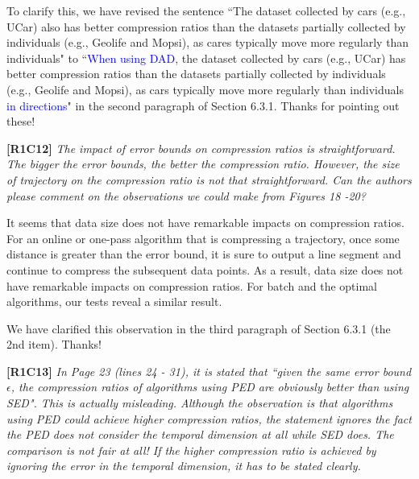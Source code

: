 \documentclass{letter}
\begin{document}
{To clarify this, we have revised the sentence ``The dataset collected by cars (e.g., UCar) also has better compression ratios than the datasets partially collected by individuals (e.g., Geolife and Mopsi), as cares typically move more regularly than individuals" to ``\textcolor{blue}{When using DAD,} the dataset collected by cars (e.g., UCar) has better compression ratios than the datasets partially collected by individuals (e.g., Geolife and Mopsi), as cars typically move more regularly than individuals \textcolor{blue}{in directions}" in the second paragraph of Section 6.3.1.
Thanks for pointing out these!


\textbf{[R1C12]} \emph{The impact of error bounds on compression ratios is straightforward. The bigger the error bounds, the better the compression ratio. However, the size of trajectory on the compression ratio is not that straightforward. Can the authors please comment on the observations we could make from Figures 18 -20? }

It seems that data size does not have remarkable impacts on compression ratios. For an online or one-pass algorithm that is compressing a trajectory, once some distance is greater than the error bound, it is sure to output a line segment and continue to compress the subsequent data points. As a result, data size does not have remarkable impacts on compression ratios. For batch and the optimal algorithms, our tests reveal a similar result.

We have clarified this observation in the third paragraph of Section 6.3.1 (the 2{nd} item). Thanks!



\textbf{[R1C13]} \emph{ In Page 23 (lines 24 - 31), it is stated that ``given the same error bound $\epsilon$, the compression ratios of algorithms using PED are obviously better than using SED". This is actually misleading. Although the observation is that algorithms using PED could achieve higher compression ratios, the statement ignores the fact the PED does not consider the temporal dimension at all while SED does. The comparison is not fair at all! If the higher compression ratio is achieved by ignoring the error in the temporal dimension, it has to be stated clearly.} 

}
\end{document}
